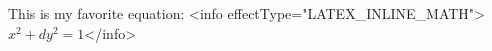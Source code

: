 \documentclass{article}
\begin{document}
This is my favorite equation: <info effectType="LATEX_INLINE_MATH">$x^{2}+dy^{2}=1$</info>
\end{document}

